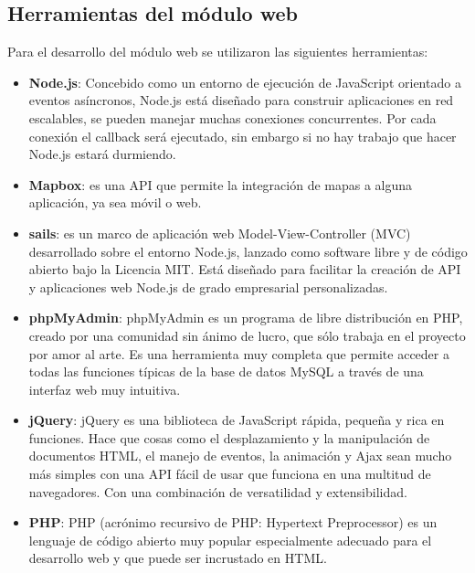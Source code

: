 \subsection{Herramientas del módulo web}

Para el desarrollo del módulo web se utilizaron las siguientes herramientas:

\begin{itemize}
	
	\item \textbf{Node.js}: Concebido como un entorno de ejecución de JavaScript orientado a eventos asíncronos, Node.js está diseñado para construir aplicaciones en red escalables, se pueden manejar muchas conexiones concurrentes. Por cada conexión el callback será ejecutado, sin embargo si no hay trabajo que hacer Node.js estará durmiendo\cite{node}.
	
	\item \textbf{Mapbox}: es una API que permite la integración de mapas a alguna aplicación, ya sea móvil o web\cite{mapbox}.
	
	\item \textbf{sails}: es un marco de aplicación web Model-View-Controller (MVC) desarrollado sobre el entorno Node.js, lanzado como software libre y de código abierto bajo la Licencia MIT. Está diseñado para facilitar la creación de API y aplicaciones web Node.js de grado empresarial personalizadas\cite{sails}.
	
	
	\item \textbf{phpMyAdmin}: phpMyAdmin es un programa de libre distribución en PHP, creado por una comunidad sin ánimo de lucro, que sólo trabaja en el proyecto por amor al arte. Es una herramienta muy completa que permite acceder a todas las funciones típicas de la base de datos MySQL a través de una interfaz web muy intuitiva\cite{phpMyAdmin}.
		
	\item \textbf{jQuery}: jQuery es una biblioteca de JavaScript rápida, pequeña y rica en funciones. Hace que cosas como el desplazamiento y la manipulación de documentos HTML, el manejo de eventos, la animación y Ajax sean mucho más simples con una API fácil de usar que funciona en una multitud de navegadores. Con una combinación de versatilidad y extensibilidad\cite{jQuery}.
	
	\item \textbf{PHP}: PHP (acrónimo recursivo de PHP: Hypertext Preprocessor) es un lenguaje de código abierto muy popular especialmente adecuado para el desarrollo web y que puede ser incrustado en HTML\cite{PHP}.
	

\end{itemize}
